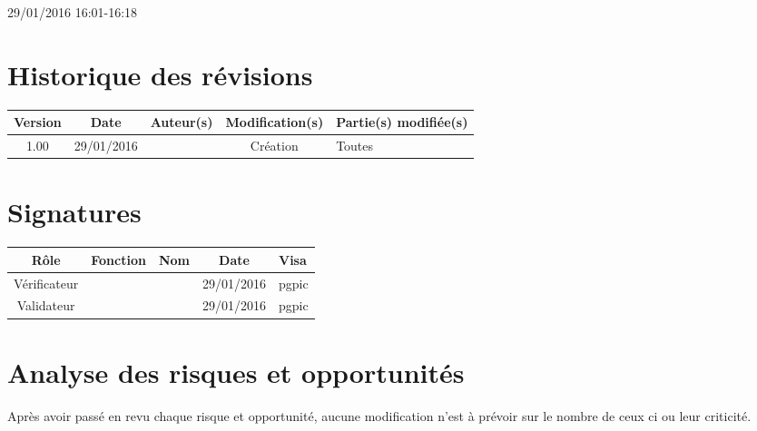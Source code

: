 \documentclass [a4paper] {article}
\begin{document}
29/01/2016			 				%
\hfill   
\hfill 	 16:01-16:18 				%



\section*{Historique des révisions}
\begin{center}
			\begin{tabular}{| c | c | c | c | p{4cm} |}
				\hline
				\rowcolor{Gray}
				Version & Date & Auteur(s) & Modification(s) & Partie(s) modifiée(s)		 \\
				\hline
				1.00 & 29/01/2016 & \Pierre & Création & Toutes \\
		\hline		
			\end{tabular}
		\end{center}

\section*{Signatures}

		\begin{center}
			\begin{tabular}{| c | c | c | c | p{4cm} |}
				\hline
				\rowcolor{Gray}
				Rôle & Fonction & Nom & Date & Visa		 \\
				\hline
				Vérificateur & \RQA & \Kafui & 29/01/2016 & pgpic \\[30pt]
				\hline
				Validateur & \CP & \Sergi & 29/01/2016 & pgpic \\[30pt]	
				\hline
			\end{tabular}
		\end{center}
		
\newpage		


\section{Analyse des risques et opportunités}
Après avoir passé en revu chaque risque et opportunité, aucune modification n'est à prévoir sur le nombre de ceux ci ou leur criticité.



\end{document}
